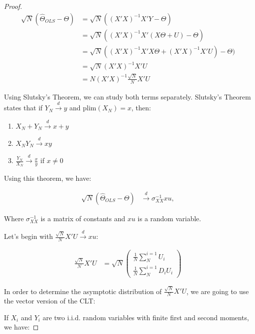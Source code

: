 \documentclass[
]{book}
\providecommand{\tightlist}{%
  \setlength{\itemsep}{0pt}\setlength{\parskip}{0pt}}
\theoremstyle{definition}
\theoremstyle{definition}
\theoremstyle{definition}
\theoremstyle{definition}
\theoremstyle{remark}
\begin{document}
\begin{proof}
\iffalse{} {Proof. } \fi{}
\begin{align*}
\sqrt{N}(\hat{\Theta}_{OLS}-\Theta) & = \sqrt{N}((X'X)^{-1}X'Y-\Theta) \\
                                    & = \sqrt{N}((X'X)^{-1}X'(X\Theta+U)-\Theta) \\
                                    & = \sqrt{N}((X'X)^{-1}X'X\Theta+(X'X)^{-1}X'U)-\Theta) \\
                                    & = \sqrt{N}(X'X)^{-1}X'U \\
                                    & = N(X'X)^{-1}\frac{\sqrt{N}}{N}X'U
\end{align*}

Using Slutsky's Theorem, we can study both terms separately.
Slutsky's Theorem states that if \(Y_N\stackrel{d}{\rightarrow}y\) and \(\text{plim}(X_N)=x\), then:

\begin{enumerate}
\def\labelenumi{\arabic{enumi}.}
\tightlist
\item
  \(X_N+Y_N\stackrel{d}{\rightarrow}x+y\)
\item
  \(X_NY_N\stackrel{d}{\rightarrow}xy\)
\item
  \(\frac{Y_N}{X_N}\stackrel{d}{\rightarrow}\frac{x}{y}\) if \(x\neq0\)
\end{enumerate}

Using this theorem, we have:

\begin{align*}
\sqrt{N}(\hat{\Theta}_{OLS}-\Theta) & \stackrel{d}{\rightarrow} \sigma_{XX}^{-1}xu,
\end{align*}

Where \(\sigma_{XX}^{-1}\) is a matrix of constants and \(xu\) is a random variable.

Let's begin with \(\frac{\sqrt{N}}{N}X'U\stackrel{d}{\rightarrow}xu\):

\begin{align*}
\frac{\sqrt{N}}{N}X'U & = \sqrt{N}\left(\begin{array}{c}  \frac{1}{N}\sum^{i=1}_{N}U_i\\  \frac{1}{N}\sum^{i=1}_{N}D_iU_i\end{array}\right)
\end{align*}

In order to determine the asymptotic distribution of \(\frac{\sqrt{N}}{N}X'U\), we are going to use the vector version of the CLT:

If \(X_i\) and \(Y_i\) are two i.i.d. random variables with finite first and second moments, we have:


\end{proof}
\end{document}
